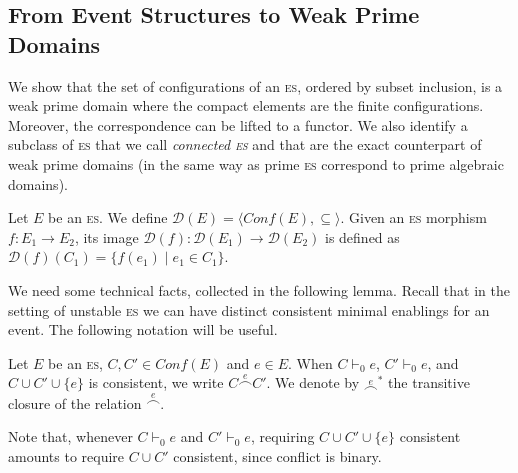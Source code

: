 \documentclass[conference]{IEEEtran}
\newcommand{\esabbr}{\textsc{es}}
\newcommand{\conf}[1]{\ensuremath{\mathit{Conf}({#1})}}
\newcommand{\conn}[1]{\ensuremath{\stackrel{#1}{\frown}}}
\newcommand{\zdom}[0]{\ensuremath{\mathcal{D}}}
\newcommand{\dom}[1]{\ensuremath{\zdom({#1})}}
\begin{document}
\subsection{{From Event Structures to Weak Prime Domains}}
\label{ss:es-to-domain}

We show that the set of configurations of an {\esabbr}, ordered by
subset inclusion, is a weak prime domain where the compact elements
are the finite configurations.
Moreover, the
correspondence can be lifted to a functor. We also identify a subclass
of {\esabbr} that we call \emph{connected {\esabbr}} and that are the exact counterpart of
weak prime domains (in the same way as prime {\esabbr} correspond to prime
algebraic domains).


\begin{definition}
  Let ${E}$ be an {\esabbr}. We define
  $\dom{{E}} = \langle \conf{{E}}, \subseteq \rangle$.
  Given an {\esabbr} morphism $f : {E}_1 \to {E}_2$, its image
  $\dom{f} : \dom{{E}_1} \to \dom{{E}_2}$ is defined as
  $\dom{f}(C_1) =   \{ f(e_1) \mid e_1 \in C_1 \}$.
\end{definition}

We need some technical facts, collected in the following lemma.
Recall that in the setting of unstable {\esabbr} we can have distinct
consistent minimal enablings for an event. The following notation will be useful.

\begin{definition}
  Let $E$ be an {\esabbr}, $C, C' \in \conf{E}$ and $e \in E$.
  When $C \vdash_0 e$, $C' \vdash_0 e$, and $C \cup C' \cup \{ e \}$
  is consistent, we write $C \conn{e} C'$. We denote by $\conn{e}^*$ the
  transitive closure of the relation $\conn{e}$.
\end{definition}

Note that, whenever $C \vdash_0 e$ and $C' \vdash_0 e$, requiring 
$C \cup C' \cup \{ e \}$ consistent amounts to require  $C \cup C'$ 
consistent, since conflict is binary.
\end{document}
